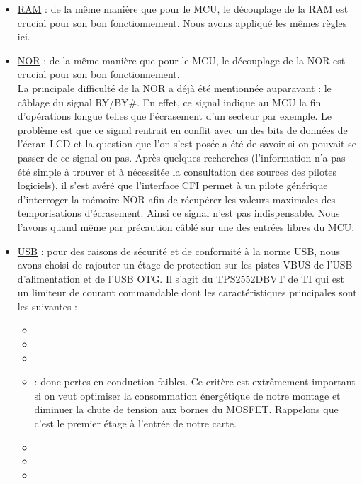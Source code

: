\begin{itemize}
	\item \hyperlink{Schematic.4}{RAM} : de la même manière que pour le MCU, le découplage de la RAM est crucial pour son bon fonctionnement.
	      Nous avons appliqué les mêmes règles ici.\\
	      	                  
	\item \hyperlink{Schematic.5}{NOR} : de la même manière que pour le MCU, le découplage de la NOR est crucial pour son bon fonctionnement.\\
	      La principale difficulté de la NOR a déjà été mentionnée auparavant : le câblage du signal RY/BY\#.
	      En effet, ce signal indique au MCU la fin d'opérations longue telles que l'écrasement d'un secteur par exemple.
	      Le problème est que ce signal rentrait en conflit avec un des bits de données de l'écran LCD et la question que l'on s'est posée a été de savoir si on pouvait se passer de ce signal ou pas.
	      Après quelques recherches (l'information n'a pas été simple à trouver et à nécessitée la consultation des sources des pilotes logiciels), il s'est avéré que l'interface \gls{CFI} permet à un pilote générique d'interroger la mémoire NOR afin de récupérer les valeurs maximales des temporisations d'écrasement.
	      Ainsi ce signal n'est pas indispensable.
	      Nous l'avons quand même par précaution câblé sur une des entrées libres du MCU.\\
	      	                  
	\item \hyperlink{Schematic.6}{USB} : pour des raisons de sécurité et de conformité à la norme USB, nous avons choisi de rajouter un étage de protection sur les pistes VBUS de l'USB d'alimentation et de l'USB OTG.
	      Il s'agit du TPS2552DBVT de TI qui est un limiteur de courant commandable dont les caractéristiques principales sont les suivantes :
	      	                  
	      \begin{itemize}
	      	\item {}
	      	\item {}
	      	\item {}
	      	\item {} : donc pertes en conduction faibles. 
	      	      Ce critère est extrêmement important si on veut optimiser la consommation énergétique de notre montage et diminuer la chute de tension aux bornes du MOSFET.
	      	      Rappelons que c'est le premier étage à l'entrée de notre carte.
	      	\item {}
	      	\item {}
	      	\item {}
	      \end{itemize}
	      	                  

\end{itemize}
